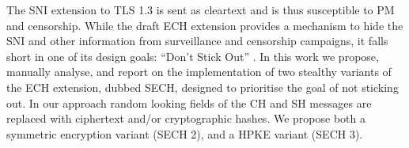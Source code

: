 

\thesistitlepage                                  %



\begin{thesisabstract}                            %
The \ac{SNI} extension to \ac{TLS} 1.3 is sent as cleartext and is thus susceptible to \ac{PM} and censorship.
While the draft \ac{ECH} extension provides a mechanism to hide the \ac{SNI} and other information from surveillance and censorship campaigns,
it falls short in one of its design goals:
``Don’t Stick Out'' \citep[Section~3.4]{rfc8744-issues}.
In this work we propose, manually analyse, and report on the implementation of two stealthy variants of the \ac{ECH} extension, dubbed \ac{SECH},
designed to prioritise the goal of not sticking out.
In our approach random looking fields
of the \ac{CH} and \ac{SH} messages are replaced with ciphertext
and/or cryptographic hashes.
We propose both a symmetric encryption variant (\ac{SECH} 2), and a \ac{HPKE} variant (\ac{SECH} 3).

\end{thesisabstract}


  
  
\tableofcontents                                  %
\listoftables                                     %
\listoffigures                                    %
\listoflistings





%


